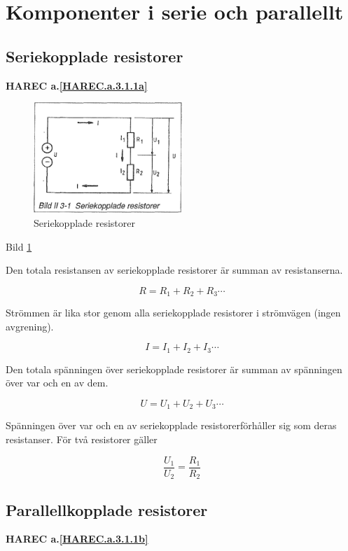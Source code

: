 \section{Komponenter i serie och parallellt}

\subsection{Seriekopplade resistorer}
\textbf{HAREC a.\ref{HAREC.a.3.1.1a}\label{myHAREC.a.3.1.1a}}

\begin{figure}
\includegraphics[width=0.5\textwidth]{images/bild_2_3-01}
\caption{Seriekopplade resistorer}
\label{fig:BildII3-01}
\end{figure}

Bild \ref{fig:BildII3-01}

Den totala resistansen av seriekopplade resistorer är summan av resistanserna.

\[R = R_1 + R_2 + R_3 \cdots \]

Strömmen är lika stor genom alla seriekopplade resistorer i strömvägen (ingen
avgrening).

\[I = I_1 + I_2 + I_3 \cdots \]

Den totala spänningen över seriekopplade resistorer är summan av spänningen över
var och en av dem.

\[U = U_1 + U_2 + U_3 \cdots \]

Spänningen över var och en av seriekopplade resistorerförhåller sig som deras
resistanser. För två resistorer gäller

\[\frac{U_1}{U_2} = \frac{R_1}{R_2}\]


\subsection{Parallellkopplade resistorer}
\textbf{HAREC a.\ref{HAREC.a.3.1.1b}\label{myHAREC.a.3.1.1b}}


